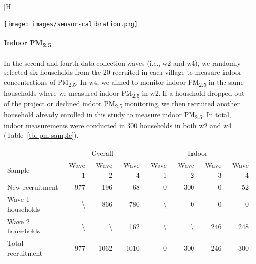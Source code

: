\documentclass[
  letterpaper,
  DIV=11,
  numbers=noendperiod]{scrartcl}
\makeatletter
\let\oldparagraph\paragraph
\renewcommand{\paragraph}[1]{\oldparagraph{#1}\mbox{}}
\renewenvironment{table}%
   {\renewcommand\familydefault\sfdefault
    \@float{table}}
   {\end@float}
\renewenvironment{figure}%
   {\renewcommand\familydefault\sfdefault
    \@float{figure}}
   {\end@float}
\makeatother
\begin{document}
\begin{figure}[H]

{\centering \texttt{[image: images/sensor-calibration.png]}

}

\caption{\label{fig-calibration}Calibration of real-time sensors against
a reference monitor at University of the Chinese Academy of Sciences.}

\end{figure}

\hypertarget{indoor-pm2.5}{%
\paragraph{\texorpdfstring{Indoor
PM\textsubscript{2.5}}{Indoor PM2.5}}\label{indoor-pm2.5}}

In the second and fourth data collection waves (i.e., w2 and w4), we
randomly selected six households from the 20 recruited in each village
to measure indoor concentrations of PM\textsubscript{2.5}. In w4, we
aimed to monitor indoor PM\textsubscript{2.5} in the same households
where we measured indoor PM\textsubscript{2.5} in w2. If a household
dropped out of the project or declined indoor PM\textsubscript{2.5}
monitoring, we then recruited another household already enrolled in this
study to measure indoor PM\textsubscript{2.5}. In total, indoor
measurements were conducted in 300 households in both w2 and w4
(Table~\ref{tbl-pm-sample}).

\hypertarget{tbl-pm-sample}{}
\begin{table}
\caption{\label{tbl-pm-sample}Household recruitment for overall and indoor air quality measurements. }\tabularnewline

\centering
\begin{tabular}{lrrrrrrr}
\toprule
\multicolumn{1}{c}{ } & \multicolumn{3}{c}{Overall} & \multicolumn{4}{c}{Indoor} \\
\cmidrule(l{3pt}r{3pt}){2-4} \cmidrule(l{3pt}r{3pt}){5-8}
Sample & Wave 1 & Wave 2 & Wave 4 & Wave 1 & Wave 2 & Wave 3 & Wave 4\\
\midrule
New recruitment & 977 & 196 & 68 & 0 & 300 & 0 & 52\\
Wave 1 households & \textbackslash{} & 866 & 780 & \textbackslash{} & 0 & 0 & 0\\
Wave 2 households & \textbackslash{} & \textbackslash{} & 162 & \textbackslash{} & \textbackslash{} & 246 & 248\\
Total recruitment & 977 & 1062 & 1010 & 0 & 300 & 246 & 300\\
\bottomrule
\end{tabular}
\end{table}
\end{document}
